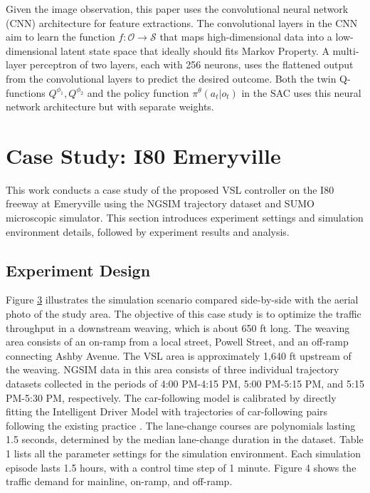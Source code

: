 \documentclass[11pt, letterpaper]{article}
\begin{document}
Given the image observation, this paper uses the convolutional neural network (CNN) architecture for feature extractions. The convolutional layers in the CNN aim to learn the function $f:\mathcal{O}\rightarrow\mathcal{S}$ that maps high-dimensional data into a low-dimensional latent state space that ideally should fits Markov Property. A multi-layer perceptron of two layers, each with 256 neurons, uses the flattened output from the convolutional layers to predict the desired outcome. Both the twin Q-functions $Q^{\phi_1}, Q^{\phi_2}$ and the policy function $\pi^\theta(a_t|o_t)$ in the SAC uses this neural network architecture but with separate weights.

\section{Case Study: I80 Emeryville}

This work conducts a case study of the proposed VSL controller on the I80 freeway at Emeryville using the NGSIM trajectory dataset\citep{ngsim2020} and SUMO microscopic simulator\citep{lopez2018microscopic}. This section introduces experiment settings and simulation environment details, followed by experiment results and analysis.

\subsection{Experiment Design}

Figure \hyperref[fig:3]{3} illustrates the simulation scenario compared side-by-side with the aerial photo of the study area. The objective of this case study is to optimize the traffic throughput in a downstream weaving, which is about 650 ft long. The weaving area consists of an on-ramp from a local street, Powell Street, and an off-ramp connecting Ashby Avenue. The VSL area is approximately 1,640 ft upstream of the weaving. NGSIM data in this area consists of three individual trajectory datasets collected in the periods of 4:00 PM-4:15 PM, 5:00 PM-5:15 PM, and 5:15 PM-5:30 PM, respectively. The car-following model is calibrated by directly fitting the Intelligent Driver Model with trajectories of car-following pairs following the existing practice \citep{kurtc2016calibrating, zhu2018modeling}. The lane-change courses are polynomials lasting 1.5 seconds, determined by the median lane-change duration in the dataset. Table 1 lists all the parameter settings for the simulation environment. Each simulation episode lasts 1.5 hours, with a control time step of 1 minute. Figure 4 shows the traffic demand for mainline, on-ramp, and off-ramp.
\end{document}
